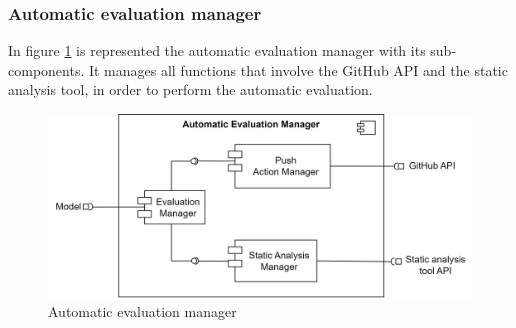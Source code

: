 \subsubsection*{Automatic evaluation manager}
In figure \ref{fig:evalA-man} is represented the automatic evaluation manager with its sub-components. It manages all functions that involve the GitHub API and the static analysis tool, in order to perform the automatic evaluation.
\begin{figure}[h]
    \centering
    \includegraphics[scale = 0.5]{images/evalA-man.png}
    \caption{Automatic evaluation manager}
    \label{fig:evalA-man}
\end{figure}

\clearpage
